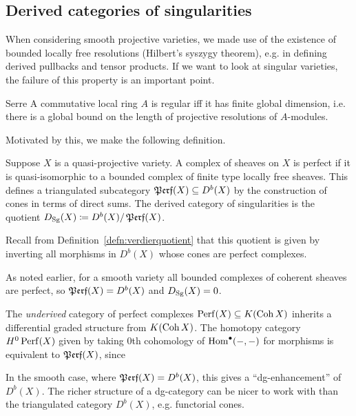 
\subsection{Derived categories of singularities}

When considering smooth projective varieties, we made use of the existence of
bounded locally free resolutions (Hilbert's syszygy theorem), e.g. in defining
derived pullbacks and tensor products. If we want to look at singular varieties,
the failure of this property is an important point.

\begin{theorem}{Serre}{}
    A commutative local ring $A$ is regular iff it has finite global dimension,
    i.e. there is a global bound on the length of projective resolutions of
    $A$-modules.
\end{theorem}

Motivated by this, we make the following definition.

\begin{definition}{}{}
    Suppose $X$ is a quasi-projective variety. A complex of sheaves on $X$ is
    perfect if it is quasi-isomorphic to a bounded complex of finite type
    locally free sheaves. This defines a triangulated subcategory
    $\operatorname{\mathfrak{Perf}}(X)\subseteq D^b(X)$ by the construction of cones in terms of direct
    sums. The derived category of singularities is the quotient
    $D_{\mathrm{Sg}}(X)\coloneqq D^b(X)/\operatorname{\mathfrak{Perf}}(X)$.
\end{definition}

Recall from Definition~\ref{defn:verdierquotient} that this quotient is given by
inverting all morphisms in $D^b(X)$ whose cones are perfect complexes.

\begin{remark}{}{}
    As noted earlier, for a smooth variety all bounded complexes of coherent
    sheaves are perfect, so $\operatorname{\mathfrak{Perf}}(X)=D^b(X)$ and $D_{\mathrm{Sg}}(X)=0$.
\end{remark}

\begin{remark}{}{}
    The \emph{underived} category of perfect complexes
    $\operatorname{Perf}(X)\subseteq K(\operatorname{Coh} X)$ inherits a differential graded structure from
    $K(\operatorname{Coh} X)$. The homotopy category $H^0\operatorname{Perf}(X)$ given by taking 0th
    cohomology of $\operatorname{Hom}^\bullet(-,-)$ for morphisms is equivalent to
    $\operatorname{\mathfrak{Perf}}(X)$, since %

    In the smooth case, where $\operatorname{\mathfrak{Perf}}(X)=D^b(X)$, this gives a
    ``dg-enhancement'' of $D^b(X)$. The richer structure of a dg-category can be
    nicer to work with than the triangulated category $D^b(X)$, e.g. functorial
    cones.
\end{remark}

